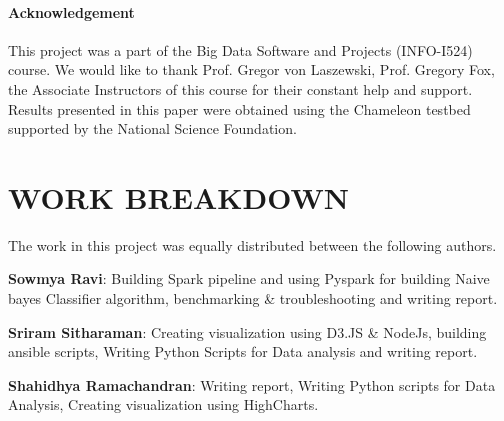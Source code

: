 \documentclass[9pt,twocolumn,twoside]{../../styles/osajnl}
\begin{document}
\paragraph{Acknowledgement}

This project was a part of the Big Data Software and Projects (INFO-I524) course. We would
like to thank Prof. Gregor von Laszewski, Prof. Gregory Fox, the
Associate Instructors of this course for their constant help and support. Results presented in
this paper were obtained using the Chameleon testbed supported by the
National Science Foundation.



\section{WORK BREAKDOWN}
	The work in this project was equally distributed between the following authors.
	
	\textbf{Sowmya Ravi}: Building Spark pipeline and using Pyspark for building Naive bayes Classifier algorithm, benchmarking \& troubleshooting and writing report.
	
	\textbf{Sriram Sitharaman}: Creating visualization using D3.JS \& NodeJs, building ansible scripts, Writing Python Scripts for Data analysis and writing report.
	
	\textbf{Shahidhya Ramachandran}: Writing report, Writing Python scripts for Data Analysis, Creating visualization using HighCharts. 
	
\end{document}
